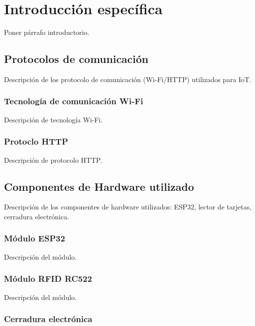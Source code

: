\chapter{Introducción específica} %

\label{Chapter2}


Poner párrafo introductorio.

\section{Protocolos de comunicación}

Descripción de los protocolo de comunicación (Wi-Fi/HTTP) utilizados para IoT.

\subsection{Tecnología de comunicación Wi-Fi}

Descripción de tecnología Wi-Fi.

\subsection{Protoclo HTTP}

Descripción de protocolo HTTP.

\section{Componentes de Hardware utilizado}

Descripción de los componentes de hardware utilizados: ESP32, lector de tarjetas, cerradura electrónica.

\subsection{Módulo ESP32}

Descripción del módulo.

\subsection{Módulo RFID RC522}

Descripción del módulo.

\subsection{Cerradura electrónica}

